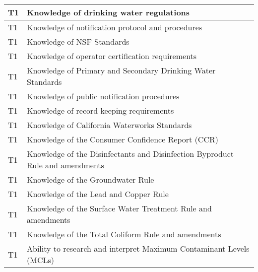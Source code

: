 \begin{table}[H]
\begin{tabular}{| m{1cm} |m{15cm} |}
T1 & Knowledge of drinking   water regulations                                                                                 \\ \hline
T1 & Knowledge of   notification protocol and procedures                                                                       \\ \hline
T1 & Knowledge of NSF   Standards                                                                                              \\ \hline
T1 & Knowledge of operator   certification requirements                                                                        \\ \hline
T1 & Knowledge of Primary   and Secondary Drinking Water Standards                                                             \\ \hline
T1 & Knowledge of public   notification procedures                                                                             \\ \hline
T1 & Knowledge of record   keeping requirements                                                                                \\ \hline
T1 & Knowledge of   California Waterworks Standards                                                                            \\ \hline
T1 & Knowledge of the   Consumer Confidence Report (CCR)                                                                       \\ \hline
T1 & Knowledge of the   Disinfectants and Disinfection Byproduct Rule and amendments                                           \\ \hline
T1 & Knowledge of the   Groundwater Rule                                                                                       \\ \hline
T1 & Knowledge of the Lead   and Copper Rule                                                                                   \\ \hline
T1 & Knowledge of the   Surface Water Treatment Rule and amendments                                                            \\ \hline
T1 & Knowledge of the   Total Coliform Rule and amendments                                                                     \\ \hline
T1 & Ability to research   and interpret Maximum Contaminant Levels (MCLs)                                                     \\ \hline

\end{tabular}
\end{table}
